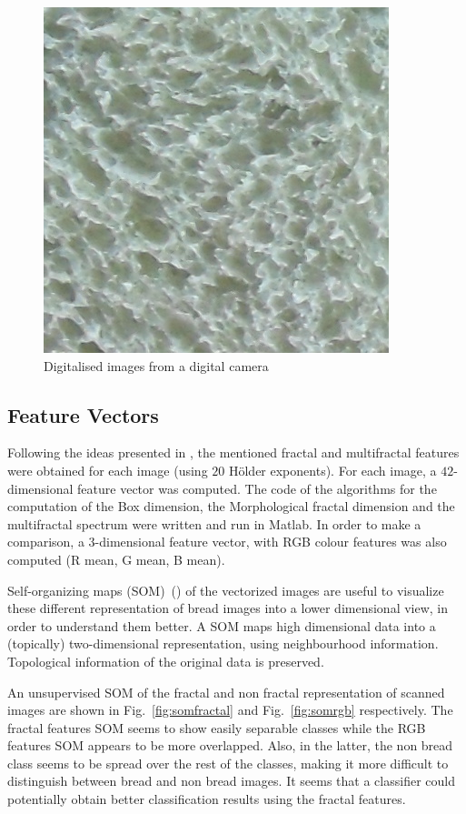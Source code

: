 \documentclass[oneside,a4paper,english,links]{amca}
\begin{document}
\begin{figure}[htb]
\includegraphics[scale=0.28]{imagenes/camera/Sa14}
\caption{Digitalised images from a digital camera}
\label{fig:camera}
\end{figure}

\subsection{Feature Vectors}


Following the ideas presented in \cite{Gonzales2008}, the mentioned fractal and multifractal features were obtained for each image (using $20$ H\"older exponents). For each image, a $42$-dimensional feature vector was computed. The code of the algorithms for the computation of the Box dimension, the Morphological fractal dimension and the multifractal spectrum were written and run in Matlab. In order to make a comparison, a $3$-dimensional feature vector, with RGB colour features was also computed (R mean, G mean, B mean).

Self-organizing maps (SOM)~(\cite{Kohonen2001}) of the vectorized images are useful to visualize these different representation of bread images into a lower dimensional view, in order to understand them better. A SOM maps high dimensional data into a (topically) two-dimensional representation, using neighbourhood information. Topological information of the original data is preserved.  

An unsupervised SOM of the fractal and non fractal representation of scanned images are shown in Fig.~\ref{fig:somfractal} and Fig.~\ref{fig:somrgb} respectively. The fractal features SOM seems to show easily separable classes while the RGB features SOM appears to be more overlapped. Also, in the latter, the non bread class seems to be spread over the rest of the classes, making it more difficult to distinguish between bread and non bread images. It seems that a classifier could potentially obtain better classification results using the fractal features. %
\end{document}
